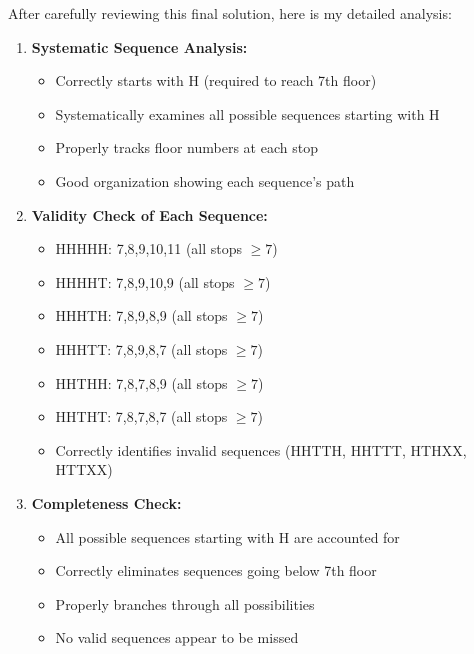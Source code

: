 \begin{thinking}
After carefully reviewing this final solution, here is my detailed analysis:

\begin{enumerate}[label=\arabic*.]
    \item \textbf{Systematic Sequence Analysis:}
    \begin{itemize}[label={[\texttt{OK}]}]
        \item Correctly starts with H (required to reach 7th floor)
        \item Systematically examines all possible sequences starting with H
        \item Properly tracks floor numbers at each stop
        \item Good organization showing each sequence's path
    \end{itemize}
    
    \item \textbf{Validity Check of Each Sequence:}
    \begin{itemize}[label={[\texttt{OK}]}]
        \item HHHHH: 7,8,9,10,11 (all stops $\geq 7$)
        \item HHHHT: 7,8,9,10,9 (all stops $\geq 7$)
        \item HHHTH: 7,8,9,8,9 (all stops $\geq 7$)
        \item HHHTT: 7,8,9,8,7 (all stops $\geq 7$)
        \item HHTHH: 7,8,7,8,9 (all stops $\geq 7$)
        \item HHTHT: 7,8,7,8,7 (all stops $\geq 7$)
        \item Correctly identifies invalid sequences (HHTTH, HHTTT, HTHXX, HTTXX)
    \end{itemize}
    
    \item \textbf{Completeness Check:}
    \begin{itemize}[label={[\texttt{OK}]}]
        \item All possible sequences starting with H are accounted for
        \item Correctly eliminates sequences going below 7th floor
        \item Properly branches through all possibilities
        \item No valid sequences appear to be missed
    \end{itemize}
    

\end{enumerate}
\end{thinking}
